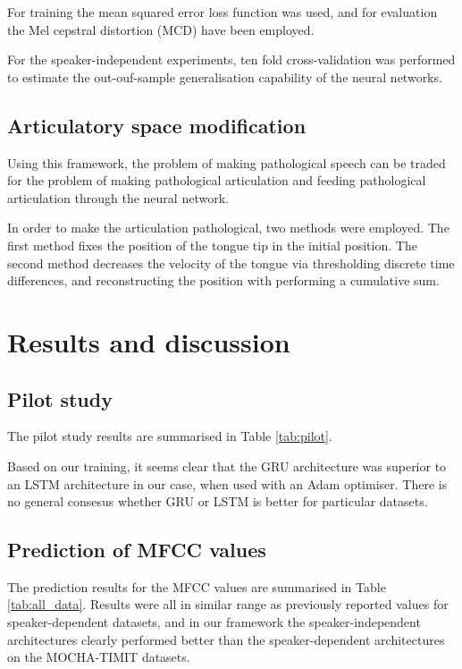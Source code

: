 \documentclass[a4paper]{article}
\begin{document}
For training the mean squared error loss function was used, and for
evaluation the Mel cepstral distortion (MCD) have been employed. \cite{Kubichek1993}

For the speaker-independent experiments, ten fold cross-validation was performed
to estimate the out-ouf-sample generalisation capability of the neural networks.

\subsection{Articulatory space modification} \label{section:speech}

Using this framework, the problem of making pathological speech
can be traded for the problem of making pathological articulation and
feeding pathological articulation through the neural network.

In order to make the articulation pathological, two methods were employed.
The first method fixes the position of the tongue tip in the initial position.
The second method decreases the velocity of the tongue via thresholding discrete time differences,
and reconstructing the position with performing a cumulative sum.




\section{Results and discussion}

\subsection{Pilot study}

The pilot study results are summarised in Table \ref{tab:pilot}.

Based on our training, it seems clear that the GRU architecture was superior to an LSTM
architecture in our case, when used with an Adam optimiser.
There is no general consesus whether GRU or LSTM is better for particular
datasets. \cite{Jozefowicz2015}

\subsection{Prediction of MFCC values}

The prediction results for the MFCC values are summarised in Table
\ref{tab:all_data}. Results were all in similar range as previously
reported values for speaker-dependent datasets, and in our framework
the speaker-independent architectures clearly performed better than the
speaker-dependent architectures on the MOCHA-TIMIT datasets.
\end{document}
